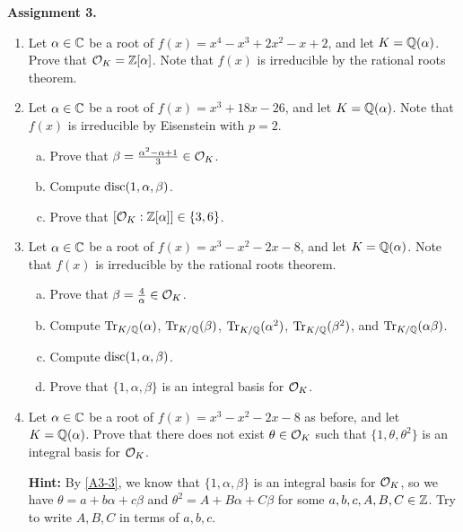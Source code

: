 {\bf Assignment 3.} 
\begin{enumerate}[leftmargin=1.5cm, label={{\bf A3-\arabic*}}]
    \item \label{A3-1} Let $\alpha \in \mathbb{C}$ be a root of $f(x) = x^4 - x^3 
    + 2x^2 - x + 2$, and let $K = \mathbb{Q}(\alpha)$. Prove that ${\cal O}_K 
    = \mathbb{Z}[\alpha]$. Note that $f(x)$ is irreducible by the rational roots 
    theorem.
    \item \label{A3-2} Let $\alpha \in \mathbb{C}$ be a root of $f(x) = x^3 + 18x - 26$, 
    and let $K = \mathbb{Q}(\alpha)$. Note that $f(x)$ is irreducible by 
    Eisenstein with $p = 2$. 
    \begin{enumerate}[(a)]
        \item Prove that $\beta = \frac{\alpha^2-\alpha+1}{3} \in {\cal O}_K$. 
        \item Compute $\operatorname{disc}(1, \alpha, \beta)$. 
        \item Prove that $[{\cal O}_K : \mathbb{Z}[\alpha]] \in \{3, 6\}$. 
    \end{enumerate}
    \item \label{A3-3} Let $\alpha \in \mathbb{C}$ be a root of $f(x) = x^3 - 
    x^2 - 2x - 8$, and let $K = \mathbb{Q}(\alpha)$. Note that $f(x)$ is irreducible 
    by the rational roots theorem. 
    \begin{enumerate}[(a)]
        \item Prove that $\beta = \frac{4}{\alpha} \in {\cal O}_K$. 
        \item Compute $\operatorname{Tr}_{K/\mathbb{Q}}(\alpha)$, $\operatorname{Tr}_{K/\mathbb{Q}}(\beta)$, 
        $\operatorname{Tr}_{K/\mathbb{Q}}(\alpha^2)$, $\operatorname{Tr}_{K/\mathbb{Q}}(\beta^2)$, and $\operatorname{Tr}_{K/\mathbb{Q}}(\alpha\beta)$. 
        \item Compute $\operatorname{disc}(1, \alpha, \beta)$. 
        \item Prove that $\{1, \alpha, \beta\}$ is an integral basis for ${\cal O}_K$.        
    \end{enumerate}
    \item \label{A3-4} Let $\alpha \in \mathbb{C}$ be a root of $f(x) = x^3 - 
    x^2 - 2x - 8$ as before, and let $K = \mathbb{Q}(\alpha)$. Prove that there 
    does not exist $\theta \in {\cal O}_K$ such that $\{1, \theta, \theta^2\}$ 
    is an integral basis for ${\cal O}_K$. 
    
    {\bf Hint:} By \ref{A3-3}, we know that $\{1, \alpha, \beta\}$ is an 
    integral basis for ${\cal O}_K$, so we have $\theta = a + b\alpha + c\beta$
    and $\theta^2 = A + B\alpha + C\beta$ for some $a, b, c, A, B, C \in \mathbb{Z}$. 
    Try to write $A, B, C$ in terms of $a, b, c$.
\end{enumerate}

